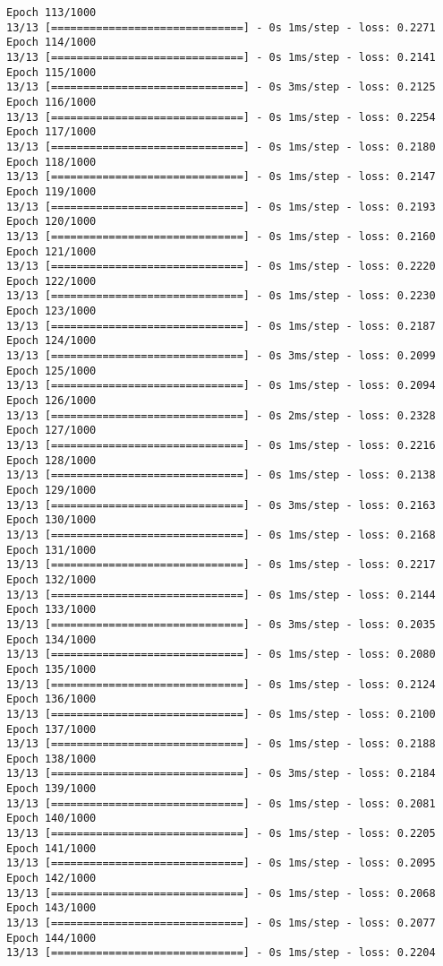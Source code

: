 \documentclass[11pt]{article}
\begin{document}
\begin{Verbatim}[commandchars=\\\{\}]
Epoch 113/1000
13/13 [==============================] - 0s 1ms/step - loss: 0.2271
Epoch 114/1000
13/13 [==============================] - 0s 1ms/step - loss: 0.2141
Epoch 115/1000
13/13 [==============================] - 0s 3ms/step - loss: 0.2125
Epoch 116/1000
13/13 [==============================] - 0s 1ms/step - loss: 0.2254
Epoch 117/1000
13/13 [==============================] - 0s 1ms/step - loss: 0.2180
Epoch 118/1000
13/13 [==============================] - 0s 1ms/step - loss: 0.2147
Epoch 119/1000
13/13 [==============================] - 0s 1ms/step - loss: 0.2193
Epoch 120/1000
13/13 [==============================] - 0s 1ms/step - loss: 0.2160
Epoch 121/1000
13/13 [==============================] - 0s 1ms/step - loss: 0.2220
Epoch 122/1000
13/13 [==============================] - 0s 1ms/step - loss: 0.2230
Epoch 123/1000
13/13 [==============================] - 0s 1ms/step - loss: 0.2187
Epoch 124/1000
13/13 [==============================] - 0s 3ms/step - loss: 0.2099
Epoch 125/1000
13/13 [==============================] - 0s 1ms/step - loss: 0.2094
Epoch 126/1000
13/13 [==============================] - 0s 2ms/step - loss: 0.2328
Epoch 127/1000
13/13 [==============================] - 0s 1ms/step - loss: 0.2216
Epoch 128/1000
13/13 [==============================] - 0s 1ms/step - loss: 0.2138
Epoch 129/1000
13/13 [==============================] - 0s 3ms/step - loss: 0.2163
Epoch 130/1000
13/13 [==============================] - 0s 1ms/step - loss: 0.2168
Epoch 131/1000
13/13 [==============================] - 0s 1ms/step - loss: 0.2217
Epoch 132/1000
13/13 [==============================] - 0s 1ms/step - loss: 0.2144
Epoch 133/1000
13/13 [==============================] - 0s 3ms/step - loss: 0.2035
Epoch 134/1000
13/13 [==============================] - 0s 1ms/step - loss: 0.2080
Epoch 135/1000
13/13 [==============================] - 0s 1ms/step - loss: 0.2124
Epoch 136/1000
13/13 [==============================] - 0s 1ms/step - loss: 0.2100
Epoch 137/1000
13/13 [==============================] - 0s 1ms/step - loss: 0.2188
Epoch 138/1000
13/13 [==============================] - 0s 3ms/step - loss: 0.2184
Epoch 139/1000
13/13 [==============================] - 0s 1ms/step - loss: 0.2081
Epoch 140/1000
13/13 [==============================] - 0s 1ms/step - loss: 0.2205
Epoch 141/1000
13/13 [==============================] - 0s 1ms/step - loss: 0.2095
Epoch 142/1000
13/13 [==============================] - 0s 1ms/step - loss: 0.2068
Epoch 143/1000
13/13 [==============================] - 0s 1ms/step - loss: 0.2077
Epoch 144/1000
13/13 [==============================] - 0s 1ms/step - loss: 0.2204

\end{Verbatim}
\end{document}
